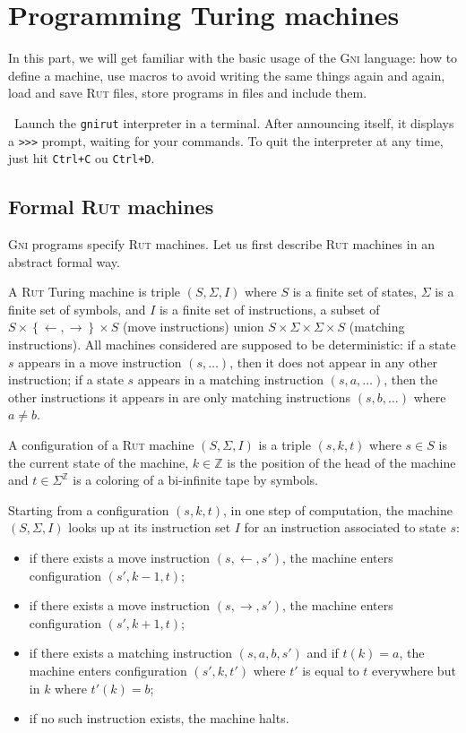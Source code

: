 \documentclass[a4paper,11pt]{article}
\theoremstyle{remark}
\newcommand\doit[1]{\medskip\par\noindent\ding{229}~\textsf{#1}}
\begin{document}
\section{Programming Turing machines}

In this part, we will get familiar with the basic usage of the \textsc{Gni} language: how to define
a machine, use macros to avoid writing the same things again and again, load and save \textsc{Rut}
files, store programs in files and include them.

\doit{Launch the \texttt{gnirut} interpreter in a terminal. After announcing itself, it displays a
\texttt{>>>} prompt, waiting for your commands. To quit the interpreter at any time, just hit 
\texttt{Ctrl+C} ou \texttt{Ctrl+D}.}

\subsection{Formal \textsc{Rut} machines}

\textsc{Gni} programs specify \textsc{Rut} machines. Let us first describe \textsc{Rut} machines
in an abstract formal way.

\smallskip
A \textsc{Rut} Turing machine is triple $(S,\Sigma,I)$ where $S$ is a finite set of states,
$\Sigma$ is a finite set of symbols, and $I$ is a finite set of instructions, a subset of
$S\times \left\{\leftarrow,\rightarrow\right\}\times S$ (move instructions) union
$S\times\Sigma\times\Sigma\times S$ (matching instructions). All machines considered are
supposed to be deterministic: if a state $s$ appears in a move instruction $(s,\ldots)$, then
it does not appear in any other instruction; if a state $s$ appears in a matching instruction
$(s,a,\ldots)$, then the other instructions it appears in are only matching instructions
$(s,b,\ldots)$ where $a\neq b$.

\smallskip A configuration of a \textsc{Rut} machine $(S,\Sigma,I)$ is a triple $(s,k,t)$ 
where $s\in S$ is the current state of the machine, $k\in\mathbb{Z}$ is the position of
the head of the machine and $t\in\Sigma^\mathbb{Z}$ is a coloring of a bi-infinite tape by symbols.

\smallskip Starting from a configuration $(s,k,t)$, in one step of computation, the machine
$(S,\Sigma,I)$ looks up at its instruction set $I$ for an instruction associated to state $s$:
\begin{itemize}
	\item if there exists a move instruction $(s,\leftarrow,s')$, the machine enters configuration $(s',k-1,t)$;
	\item if there exists a move instruction $(s,\rightarrow,s')$, the machine enters configuration $(s',k+1,t)$;
	\item if there exists a matching instruction $(s,a,b,s')$ and if $t(k)=a$, the machine enters configuration $(s',k,t')$ where $t'$ is equal to $t$ everywhere but in $k$ where $t'(k)=b$;
	\item if no such instruction exists, the machine halts.
\end{itemize}
\end{document}
